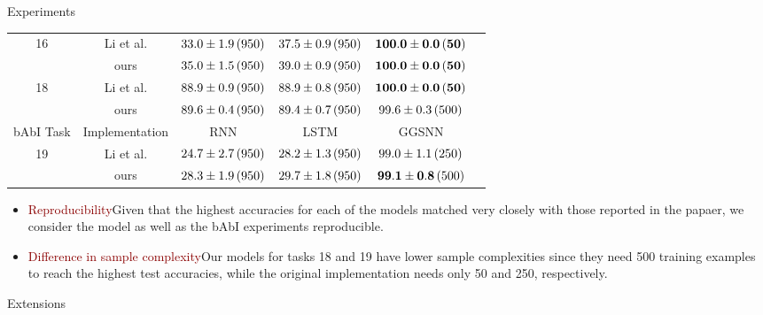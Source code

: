 \documentclass[final,hyperref={pdfpagelabels=false}]{beamer}
\begin{document}
\begin{frame}[t]
\begin{columns}[t]
\begin{column}{.3\textwidth}
\begin{block}{Experiments}
\begin{table}[t]
\begin{tabular}{cccccc}
              \multirow{2}{*}{16} & Li et al. &  $33.0 \pm 1.9\thinspace (950)$&  $37.5 \pm 0.9\thinspace (950)$ & $\mathbf{100.0 \pm 0.0\thinspace (50)}$  \\
              & ours & $35.0 \pm 1.5\thinspace (950)$ & $39.0 \pm 0.9\thinspace (950)$ & $\mathbf{100.0 \pm 0.0\thinspace (50)}$ \\  \midrule
        
              \multirow{2}{*}{18} & Li et al. & $88.9 \pm 0.9\thinspace (950)$ & $88.9 \pm 0.8\thinspace (950)$ & $\mathbf{100.0 \pm 0.0\thinspace (50)}$ \\
              & ours & $89.6 \pm 0.4\thinspace (950)$ & $89.4 \pm 0.7\thinspace (950)$ & $99.6\pm 0.3\thinspace (500)$\\ \midrule
              
              bAbI Task & Implementation & RNN & LSTM & GGSNN \\  \midrule
              
              \multirow{2}{*}{19} & Li et al. & $24.7 \pm 2.7\thinspace (950)$ & $28.2 \pm 1.3\thinspace (950)$ & $99.0\pm1.1\thinspace (250)$\\ 
              & ours & $28.3 \pm 1.9\thinspace (950)$ & $29.7 \pm 1.8\thinspace (950)$ & $\mathbf{99.1\pm 0.8}\thinspace (500)$\\ \bottomrule
        \end{tabular}
        \end{table}
        \vspace{0.2in}
        
    \begin{itemize}
        \item \textcolor{darkred}{Reproducibility}\thinspace Given that the highest accuracies for each of the models matched very closely with those reported in the papaer, we consider the model as well as the bAbI experiments reproducible.
        \item \textcolor{darkred}{Difference in sample complexity}\thinspace Our models for tasks 18 and 19 have lower sample complexities since they need 500 training examples to reach the highest test accuracies, while the original implementation needs only 50 and 250, respectively.
    \end{itemize}
    \end{block}
    
    \begin{block}{Extensions}
    
    \end{block}
    

\end{column}
\end{columns}
\end{frame}
\end{document}
